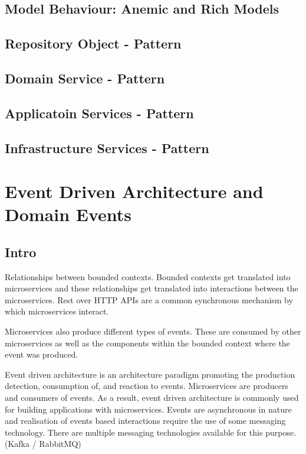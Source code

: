 \section{Model Behaviour: Anemic and Rich Models}

\section{Repository Object - Pattern}

\section{Domain Service - Pattern}

\section{Applicatoin Services - Pattern}

\section{Infrastructure Services - Pattern}

\chapter{Event Driven Architecture and Domain Events}
\section{Intro}
Relationships between bounded contexts.
Bounded contexts get translated into microservices and these relationships get translated into interactions between the microservices.
Rest over HTTP APIs are a common synchronous mechanism by which microservices interact.

Microservices also produce different types of events.
These are consumed by other microservices as well as the components within the bounded context where the event was produced.

Event driven architecture is an architecture paradigm promoting the production detection, consumption of, and reaction to events.
Microservices are producers and consumers of events.
As a result, event driven architecture is commonly used for building applications with microservices.
Events are asynchronous in nature and realisation of events based interactions require the use of some messaging technology.
There are multiple messaging technologies available for this purpose. (Kafka / RabbitMQ) %

